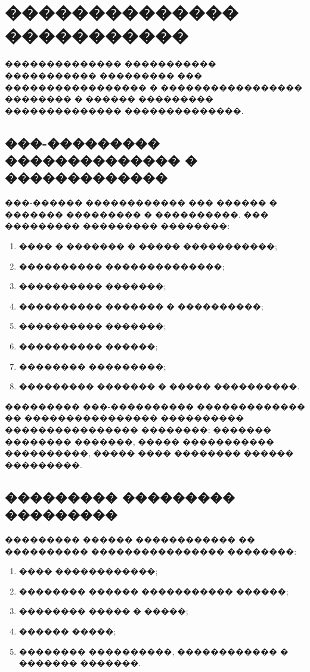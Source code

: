 \section{�������������� �����������}

�������������� ����������� ����������� ��������� ��� ����������������� � ����������������� �������� � ������ ��������� �������������� ��������������\cite{cooper2008aboutface,norman2013design,krug2014dontmake}.

\subsection{���-��������� �������������� � �������������}

���-������ ������������ ��� ������ � ������� ��������� � ����������. ��� ��������� ��������� ��������:
\begin{enumerate}
  \item ���� � ������� � ����� �����������;
  \item ���������� ��������������;
  \item ���������� �������;
  \item ���������� ������� � ����������;
  \item ���������� �������;
  \item ���������� ������;
  \item �������� ���������;
  \item ��������� ������� � ����� ����������.
\end{enumerate}

��������� ���-���������� ������������� �� ���������������� ���������� ���������������� ��������: ������� �������� �������, ����� ����������� ����������, ����� ���� �������� ������ ���������.

\subsection{��������� ��������� ���������}

��������� ������ ������������ �� ���������� ���������������� ��������:
\begin{enumerate}
  \item ���� ������������;
  \item �������� ������ ����������� ������;
  \item �������� ����� � �����;
  \item ������ �����;
  \item �������� ����������, ������������ � ������� �������.
\end{enumerate}


